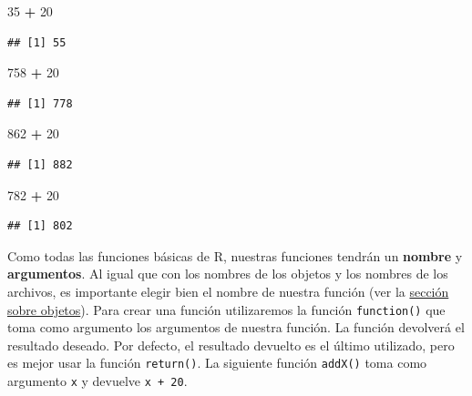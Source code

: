 \documentclass[
]{book}
\newenvironment{Shaded}{\begin{snugshade}}{\end{snugshade}}
\newcommand{\DecValTok}[1]{\textcolor[rgb]{0.00,0.00,0.81}{#1}}
\newcommand{\OperatorTok}[1]{\textcolor[rgb]{0.81,0.36,0.00}{\textbf{#1}}}
\newcommand{\StringTok}[1]{\textcolor[rgb]{0.31,0.60,0.02}{#1}}
\begin{document}
\begin{Shaded}
\begin{Highlighting}[]
\DecValTok{35} \OperatorTok{+}\StringTok{ }\DecValTok{20}
\end{Highlighting}
\end{Shaded}

\begin{verbatim}
## [1] 55
\end{verbatim}

\begin{Shaded}
\begin{Highlighting}[]
\DecValTok{758} \OperatorTok{+}\StringTok{ }\DecValTok{20}
\end{Highlighting}
\end{Shaded}

\begin{verbatim}
## [1] 778
\end{verbatim}

\begin{Shaded}
\begin{Highlighting}[]
\DecValTok{862} \OperatorTok{+}\StringTok{ }\DecValTok{20}
\end{Highlighting}
\end{Shaded}

\begin{verbatim}
## [1] 882
\end{verbatim}

\begin{Shaded}
\begin{Highlighting}[]
\DecValTok{782} \OperatorTok{+}\StringTok{ }\DecValTok{20}
\end{Highlighting}
\end{Shaded}

\begin{verbatim}
## [1] 802
\end{verbatim}

Como todas las funciones básicas de R, nuestras funciones tendrán un \textbf{nombre} y \textbf{argumentos}. Al igual que con los nombres de los objetos y los nombres de los archivos, es importante elegir bien el nombre de nuestra función (ver la \protect\hyperlink{l011object}{sección sobre objetos}). Para crear una función utilizaremos la función \texttt{function()} que toma como argumento los argumentos de nuestra función. La función devolverá el resultado deseado. Por defecto, el resultado devuelto es el último utilizado, pero es mejor usar la función \texttt{return()}. La siguiente función \texttt{addX()} toma como argumento \texttt{x} y devuelve \texttt{x\ +\ 20}.
\end{document}
